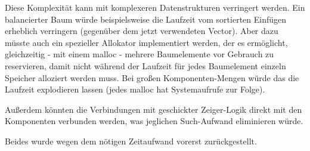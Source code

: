 Diese Komplexität kann mit komplexeren Datenstrukturen verringert werden. Ein balancierter Baum würde beispielsweise die Laufzeit vom sortierten Einfügen erheblich verringern (gegenüber dem jetzt verwendeten Vector). Aber dazu müsste auch ein spezieller Allokator implementiert werden, der es ermöglicht, gleichzeitig - mit einem malloc - mehrere Baumelemente vor Gebrauch zu reservieren, damit nicht während der Laufzeit für jedes Baumelement einzeln Speicher alloziert werden muss. Bei großen Komponenten-Mengen würde das die Laufzeit explodieren lassen (jedes malloc hat Systemaufrufe zur Folge).

Außerdem könnten die Verbindungen mit geschickter Zeiger-Logik direkt mit den Komponenten verbunden werden, was jeglichen Such-Aufwand eliminieren würde.

Beides wurde wegen dem nötigen Zeitaufwand vorerst zurückgestellt.